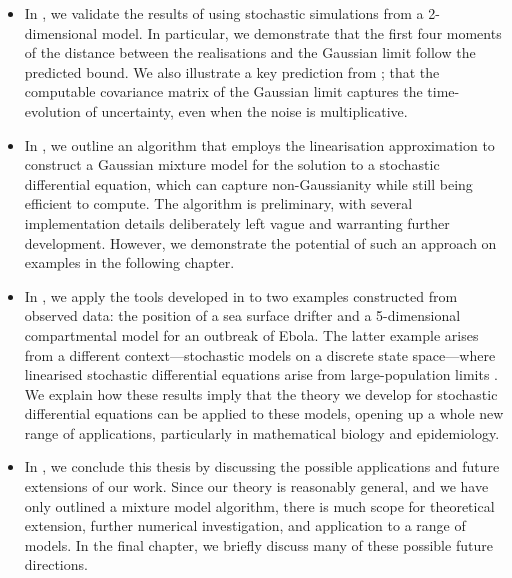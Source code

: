 \begin{itemize}
\begin{itemize}
	      \end{itemize}

	\item In , we validate the results of  using stochastic simulations from a 2-dimensional model.
	      In particular, we demonstrate that the first four moments of the distance between the realisations and the Gaussian limit follow the predicted bound.
	      We also illustrate a key prediction from ; that the computable covariance matrix of the Gaussian limit captures the time-evolution of uncertainty, even when the noise is multiplicative.

	\item In , we outline an algorithm that employs the linearisation approximation to construct a Gaussian mixture model for the solution to a stochastic differential equation, which can capture non-Gaussianity while still being efficient to compute.
	      The algorithm is preliminary, with several implementation details deliberately left vague and warranting further development.
	      However, we demonstrate the potential of such an approach on examples in the following chapter.

	\item In , we apply the tools developed in  to two examples constructed from observed data: the position of a sea surface drifter and a 5-dimensional compartmental model for an outbreak of Ebola.
	      The latter example arises from a different context---stochastic models on a discrete state space---where linearised stochastic differential equations arise from large-population limits \citep{Kurtz_1970_SolutionsOrdinaryDifferential,Kurtz_1971_LimitTheoremsSequences}.
	      We explain how these results imply that the theory we develop for stochastic differential equations can be applied to these models, opening up a whole new range of applications, particularly in mathematical biology and epidemiology.

	\item In , we conclude this thesis by discussing the possible applications and future extensions of our work.
	      Since our theory is reasonably general, and we have only outlined a mixture model algorithm, there is much scope for theoretical extension, further numerical investigation, and application to a range of models.
	      In the final chapter, we briefly discuss many of these possible future directions.


\end{itemize}



